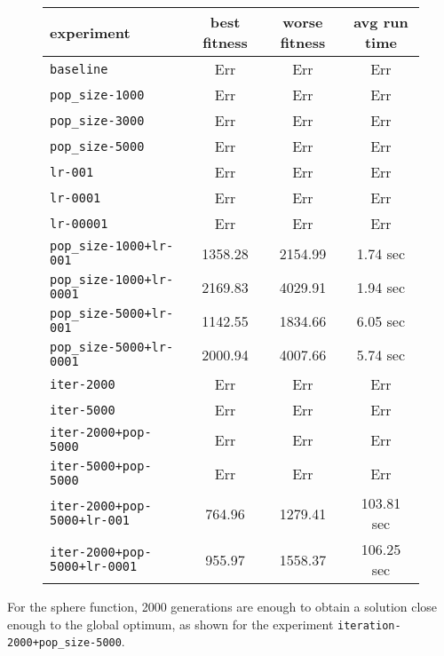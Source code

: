 \begin{figure}[htb]
	\centering
	
	\begin{tabular}{lccc}
		\toprule
		\textbf{experiment} & \textbf{best fitness} & \textbf{worse fitness} & \textbf{avg run time} \\
		\midrule
		\texttt{baseline 						} &	   Err &	    Err &	       Err \\
		\texttt{pop\_size-1000 					}    &	   Err &	    Err &	       Err \\
		\texttt{pop\_size-3000 					}    &	   Err &	    Err &	       Err \\
		\texttt{pop\_size-5000 					}    &	   Err &	    Err &	       Err \\
		\texttt{lr-001 							}   &	   Err &	    Err &	       Err \\
		\texttt{lr-0001	 						}  &	   Err &	    Err &	       Err \\
		\texttt{lr-00001	 					} &	   Err &	    Err &	       Err \\
		\texttt{pop\_size-1000+lr-001 			} &              1358.28 &	2154.99 &	  1.74 sec \\
		\texttt{pop\_size-1000+lr-0001 			} &              2169.83 &	4029.91 &	  1.94 sec \\
		\texttt{pop\_size-5000+lr-001 			} &              1142.55 &	1834.66 &	  6.05 sec \\
		\texttt{pop\_size-5000+lr-0001 			} &              2000.94 &	4007.66 &	  5.74 sec \\
		\texttt{iter-2000 						}  &	   Err &	    Err &	       Err \\
		\texttt{iter-5000 						}  &	   Err &	    Err &	       Err \\
		\texttt{iter-2000+pop-5000 	}			  &	   Err &	    Err &	       Err \\
		\texttt{iter-5000+pop-5000 	}			  &	   Err &	    Err &	       Err \\
		\texttt{iter-2000+pop-5000+lr-001 }		  &	764.96 &	1279.41 &	103.81 sec \\
		\texttt{iter-2000+pop-5000+lr-0001 }	  &	955.97 &	1558.37 &	106.25 sec \\
		\bottomrule
	\end{tabular}
	\label{tab:nes-performance-r}
\end{figure}

\bigskip
For the sphere function, 2000 generations are enough to obtain a solution close enough to the global optimum, as shown for the experiment \texttt{iteration-2000+pop\_size-5000}.

